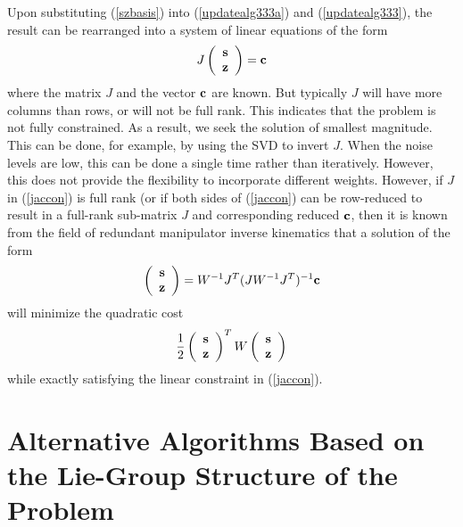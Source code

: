 \documentclass[twocolumn,10pt]{asme2ej}
\newcommand{\half}{\frac{1}{2}}
\begin{document}
Upon substituting (\ref{szbasis}) into (\ref{updatealg333a}) and (\ref{updatealg333}), the result can be rearranged into a system of linear equations of the form
\begin{equation} 
J \left(\begin{array}{c}
{\bf s} \\
{\bf z} \end{array}\right) = {\bf c}
\label{jaccon}
\end{equation}
where the matrix $J$ and the vector ${\bf c}$ are known. But typically $J$ will have more columns than rows, or will not be full rank.
This indicates that the problem is not fully constrained. As a result, we seek the solution of smallest magnitude. This can be done, for example,
by using the SVD to invert $J$. When the noise levels are low, this can be done a single time rather than iteratively. However, this does not provide
the flexibility to incorporate different weights. However, if $J$ in (\ref{jaccon}) is full rank (or if both sides of (\ref{jaccon}) can be row-reduced
to result in a full-rank sub-matrix $J$ and corresponding reduced ${\bf c}$, then it is known 
from the field of redundant manipulator inverse kinematics \cite{Klein,Maciejewski} that a solution of the form
$$ \left(\begin{array}{c}
{\bf s} \\
{\bf z} \end{array}\right) = W^{-1} J^T (J W^{-1} J^T)^{-1} {\bf c} $$
will minimize the quadratic cost
$$ \half \left(\begin{array}{c}
{\bf s} \\
{\bf z} \end{array}\right)^T W \left(\begin{array}{c}
{\bf s} \\
{\bf z} \end{array}\right) $$ 
while exactly satisfying the linear constraint in (\ref{jaccon}).

\section{Alternative Algorithms Based on the Lie-Group Structure of the Problem}
\end{document}
